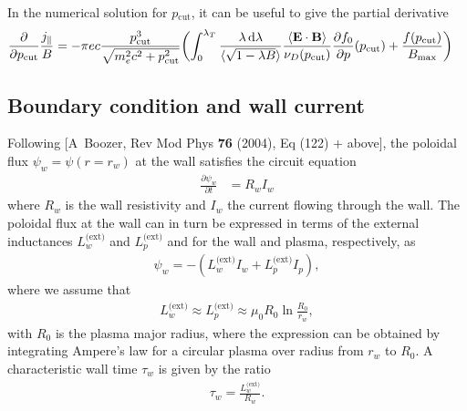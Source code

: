 \documentclass[11pt,a4paper]{article}
\newcommand{\rd}{\ensuremath{\mathrm{d}}}
\newcommand{\sub}[1]{\ensuremath{_{\text{#1}}}}
\renewcommand{\b}[1]{\ensuremath{ {\bf #1 } }}
\begin{document}
In the numerical solution for $p\sub{cut}$, it can be useful to give the partial derivative
\begin{align}
\frac{\partial}{\partial p\sub{cut}} \frac{j_\parallel}{B} &= -\pi e c \frac{p\sub{cut}^3}{\sqrt{m_e^2 c^2+p\sub{cut}^2}} \biggl( %
\int_0^{\lambda_T}\frac{\lambda\,\rd \lambda}{\langle\sqrt{1-\lambda B}\rangle} \frac{\langle\b{E}\cdot\b{B}\rangle  }{\nu_D(p\sub{cut})}\frac{\partial f_0}{\partial p}(p\sub{cut}) 
 + \frac{f(p\sub{cut})  }{B\sub{max}}\biggr)
\end{align}

\subsection{Boundary condition and wall current}
Following [A~Boozer, Rev Mod Phys {\bf 76} (2004), Eq (122) + above], the poloidal flux $\psi_w = \psi(r=r_w)$ at the wall satisfies the circuit equation
\begin{align}
\frac{\partial \psi_w}{\partial t} &= R_w I_w
\end{align}
where $R_w$ is the wall resistivity and $I_w$ the current flowing through the wall. The poloidal flux at the wall can in turn be expressed in terms of the external inductances $L_w^\text{(ext)}$ and $L_p^\text{(ext)}$ and for the wall and plasma, respectively, as
\begin{align}
\psi_w = -(L_w^\text{(ext)} I_w + L_p^\text{(ext)} I_p),
\end{align}
where we assume that 
\begin{align}
L_w^\text{(ext)} \approx L_p^\text{(ext)} \approx \mu_0 R_0 \ln\frac{R_0}{r_w},
\end{align}
with $R_0$ is the plasma major radius, where the expression can be obtained by integrating Ampere's law for a circular plasma over radius from $r_w$ to $R_0$. A characteristic wall time $\tau_w$ is given by the ratio
\begin{align}
\tau_w = \frac{L_w^\text{(ext)}}{R_w}.
\end{align}
\end{document}
